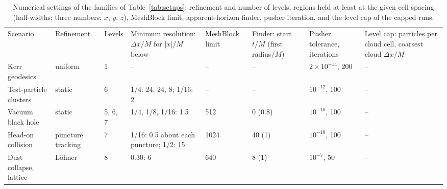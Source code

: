 \begin{table}
\end{table}

\begin{table}
\caption{Numerical settings of the families of Table~\ref{tab:setups}: refinement and number of levels, regions held at least at the given cell spacing (half-widths; three numbers: $x$, $y$, $z$), MeshBlock limit, apparent-horizon finder, pusher iteration, and the level cap of the capped runs.}
\label{tab:setups_numerics}
\footnotesize
\setlength{\tabcolsep}{3pt}
\begin{ruledtabular}
\begin{tabular}{p{}p{}p{}p{}p{}p{}p{}p{}}
\raggedright Scenario\footnotemark[1] & \raggedright Refinement\footnotemark[2] & \raggedright Levels & \raggedright Minimum resolution: $\Delta x/M$ for $|x|/M$ below & \raggedright MeshBlock limit & \raggedright Finder: start $t/M$ (first radius$/M$)\footnotemark[3] & \raggedright Pusher tolerance, iterations & \raggedright Level cap: particles per cloud cell, coarsest cloud $\Delta x/M$ \tabularnewline
\colrule
\raggedright Kerr geodesics & \raggedright uniform & \raggedright 1 & \raggedright -- & \raggedright -- & \raggedright -- & \raggedright $2\times10^{-14}$, 200 & \raggedright -- \tabularnewline
\raggedright Test-particle clusters & \raggedright static & \raggedright 6 & \raggedright 1/4: 24, 24, 8; 1/16: 2 & \raggedright -- & \raggedright -- & \raggedright $10^{-12}$, 100 & \raggedright -- \tabularnewline
\raggedright Vacuum black hole & \raggedright static & \raggedright 5, 6, 7 & \raggedright 1/4, 1/8, 1/16: 1.5 & \raggedright 512 & \raggedright 0 (0.8) & \raggedright $10^{-10}$, 100 & \raggedright -- \tabularnewline
\raggedright Head-on collision & \raggedright puncture tracking & \raggedright 7 & \raggedright 1/16: 0.5 about each puncture; 1/2: 15 & \raggedright 1024 & \raggedright 40 (1) & \raggedright $10^{-10}$, 100 & \raggedright -- \tabularnewline
\raggedright Dust collapse, lattice & \raggedright L\"ohner & \raggedright 8 & \raggedright 0.30: 6 & \raggedright 640 & \raggedright 8 (1) & \raggedright $10^{-7}$, 50 & \raggedright -- \tabularnewline

\end{tabular}
\end{ruledtabular}
\end{table}
